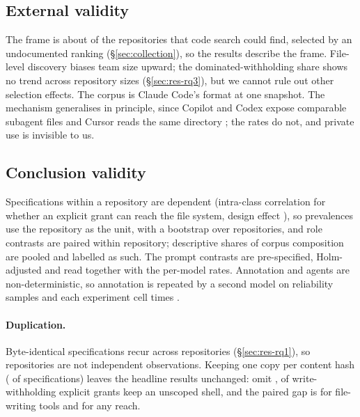 \subsection{External validity}

The frame is about \pctFrameOfRerun{} of the repositories that code search could find, selected by an undocumented
ranking (\S\ref{sec:collection}), so the results describe the frame. File-level discovery biases team size upward;
the dominated-withholding share shows no trend across repository sizes (\S\ref{sec:res-rq3}), but we cannot rule out
other selection effects. The corpus is Claude Code's
format at one snapshot. The mechanism generalises in principle, since Copilot and Codex expose comparable subagent files
and Cursor reads the same directory \citep{GitHubCustomAgentsDoc,OpenAICodexSubagentsDoc,CursorSubagentsDoc}; the rates
do not, and private use is invisible to us.

\subsection{Conclusion validity}

Specifications within a repository are dependent (intra-class correlation \iccValue{} for whether an explicit grant
can reach the file system, design effect ), so
prevalences use the repository as the unit, with a bootstrap over repositories, and role contrasts are paired within
repository; descriptive shares of corpus composition are pooled and labelled as such. The prompt contrasts are
pre-specified, Holm-adjusted \citep{holm1979simple} and read together with the per-model rates. Annotation and agents
are non-deterministic, so annotation is repeated by a second model on reliability samples and each experiment cell
\nRepsPerCell{} times \citep{ouyang2025nondeterminism,baltes2026guidelines}.

\paragraph{Duplication.} Byte-identical specifications recur across repositories (\S\ref{sec:res-rq1}), so
repositories are not independent observations. Keeping one copy per content hash (\nSpecsDedup{} of \nSpecsEng{}
specifications) leaves the headline results unchanged: \DedupImplicit{} omit , \DedupIncoherent{} of
write-withholding explicit grants keep an unscoped shell, and the paired gap is \DedupGapWrite{} for file-writing tools
and \DedupGapAuthority{} for any reach.

